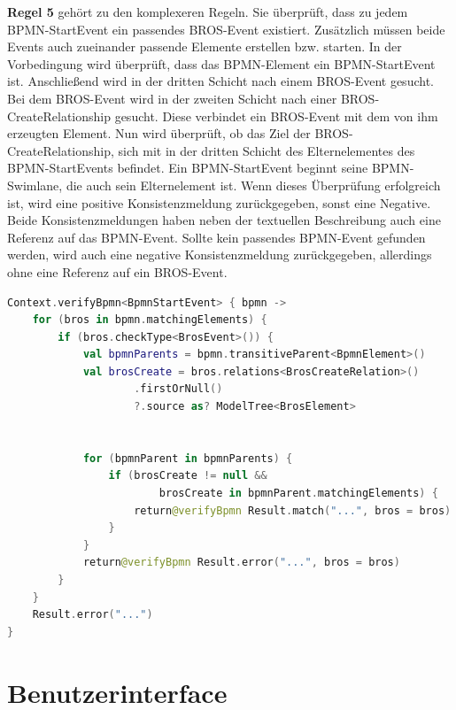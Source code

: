 \textbf{Regel 5} gehört zu den komplexeren Regeln.
Sie überprüft, dass zu jedem BPMN-StartEvent ein passendes BROS-Event existiert.
Zusätzlich müssen beide Events auch zueinander passende Elemente erstellen bzw. starten.
In der Vorbedingung wird überprüft, dass das BPMN-Element ein BPMN-StartEvent ist.
Anschließend wird in der dritten Schicht nach einem BROS-Event gesucht.
Bei dem BROS-Event wird in der zweiten Schicht nach einer BROS-CreateRelationship gesucht.
Diese verbindet ein BROS-Event mit dem von ihm erzeugten Element.
Nun wird überprüft, ob das Ziel der BROS-CreateRelationship, sich mit in der dritten Schicht des Elternelementes des BPMN-StartEvents befindet.
Ein BPMN-StartEvent beginnt seine BPMN-Swimlane, die auch sein Elternelement ist.
Wenn dieses Überprüfung erfolgreich ist, wird eine positive Konsistenzmeldung zurückgegeben, sonst eine Negative.
Beide Konsistenzmeldungen haben neben der textuellen Beschreibung auch eine Referenz auf das BPMN-Event.
Sollte kein passendes BPMN-Event gefunden werden, wird auch eine negative Konsistenzmeldung zurückgegeben, allerdings ohne eine Referenz auf ein BROS-Event.

\begin{lstlisting}[language=Kotlin, caption=Implementierung von Regel 5, label=lst:implementation_rule_5]
Context.verifyBpmn<BpmnStartEvent> { bpmn ->
    for (bros in bpmn.matchingElements) {
        if (bros.checkType<BrosEvent>()) {
            val bpmnParents = bpmn.transitiveParent<BpmnElement>()
            val brosCreate = bros.relations<BrosCreateRelation>()
                    .firstOrNull()
                    ?.source as? ModelTree<BrosElement>


            for (bpmnParent in bpmnParents) {
                if (brosCreate != null && 
                        brosCreate in bpmnParent.matchingElements) {
                    return@verifyBpmn Result.match("...", bros = bros)
                }
            }
            return@verifyBpmn Result.error("...", bros = bros)
        }
    }
    Result.error("...")
}
\end{lstlisting}

\pagebreak
\section{Benutzerinterface}

